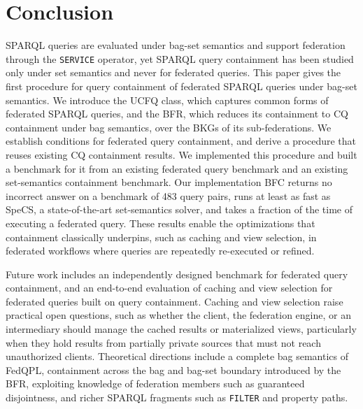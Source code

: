 \section{Conclusion}\label{sec:conclusion}

SPARQL queries are evaluated under bag-set semantics and support federation through the \texttt{SERVICE} operator, yet SPARQL query containment has been studied only under set semantics and never for federated queries.
This paper gives the first procedure for query containment of federated SPARQL queries under bag-set semantics.
We introduce the \ac{UCFQ} class, which captures common forms of federated SPARQL queries, and the \ac{BFR}, which reduces its containment to \ac{CQ} containment under bag semantics, over the \acp{BKG} of its sub-federations.
We establish conditions for federated query containment, and derive a procedure that reuses existing \ac{CQ} containment results.
We implemented this procedure and built a benchmark for it from an existing federated query benchmark and an existing set-semantics containment benchmark.
Our implementation \ac{BFC} returns no incorrect answer on a benchmark of 483 query pairs, runs at least as fast as SpeCS, a state-of-the-art set-semantics solver, and takes a fraction of the time of executing a federated query.
These results enable the optimizations that containment classically underpins, such as caching and view selection, in federated workflows where queries are repeatedly re-executed or refined.

Future work includes an independently designed benchmark for federated query containment, and an end-to-end evaluation of caching and view selection for federated queries built on query containment.
Caching and view selection raise practical open questions, such as whether the client, the federation engine, or an intermediary should manage the cached results or materialized views, particularly when they hold results from partially private sources that must not reach unauthorized clients.
Theoretical directions include a complete bag semantics of FedQPL, containment across the bag and bag-set boundary introduced by the \ac{BFR}, exploiting knowledge of federation members such as guaranteed disjointness, and richer SPARQL fragments such as \texttt{FILTER} and property paths.
